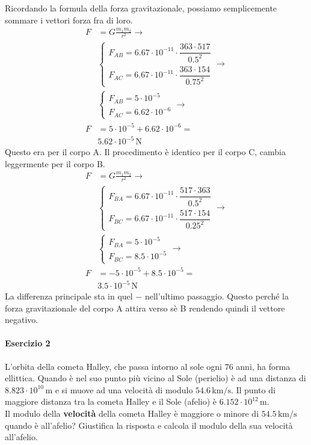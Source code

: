 Ricordando la formula della forza gravitazionale, possiamo semplicemente sommare i vettori forza fra
di loro.
\begin{align*}
  F &= G\frac{m_1m_2}{r^2} \rightarrow \\
    &\begin{cases*}
  F_{AB}  = 6.67\cdot10^{-11}\cdot\dfrac{363\cdot517}{0.5^2}\\
  F_{AC}  = 6.67\cdot10^{-11}\cdot\dfrac{363\cdot154}{0.75^2}
\end{cases*} \rightarrow\\
&\begin{cases*}
F_{AB}  = 5\cdot10^{-5}\\
F_{AC}  = 6.62\cdot10^{-6}
\end{cases*} \rightarrow\\
F &= 5\cdot10^{-5}+6.62\cdot10^{-6} = \\&
\boxed{5.62\cdot10^{-5}\,\text{N}}
\end{align*}
Questo era per il corpo A. Il procedimento è identico per il corpo C, cambia leggermente per il 
corpo B.
\begin{align*}
  F &= G\frac{m_1m_2}{r^2} \rightarrow\\
    &\begin{cases*}
  F_{BA} = 6.67\cdot10^{-11}\cdot\dfrac{517\cdot363}{0.5^2}\\
  F_{BC} = 6.67\cdot10^{-11}\cdot\dfrac{517\cdot154}{0.25^2}
\end{cases*} \rightarrow\\
&\begin{cases*}
F_{BA}  = 5\cdot10^{-5}\\
F_{BC}  = 8.5\cdot10^{-5}
\end{cases*} \rightarrow\\
F &= -5\cdot10^{-5}+8.5\cdot10^{-5} = \\
  &\boxed{3.5\cdot10^{-5}\,\text{N}}
\end{align*}
La differenza principale sta in quel $-$ nell'ultimo passaggio. Questo perché la forza 
gravitazionale del corpo A attira verso sè B rendendo quindi il vettore negativo.

\paragraph{Esercizio 2}
L'orbita della cometa Halley, che passa intorno al sole ogni $76$ anni, ha forma ellittica. Quando
è nel suo punto più vicino al Sole (perielio) è ad una distanza di $8.823\cdot10^{10}\,\text{m}$ e si
muove ad una velocità di modulo $54.6\,\text{km/s}$. Il punto di maggiore distanza tra la cometa 
Halley e il Sole (afelio) è $6.152\cdot10^{12}\,\text{m}$.\\
Il modulo della \textbf{velocità} della cometa Halley è maggiore o minore di $54.5\,\text{km/s}$ 
quando è all'afelio? Giustifica la risposta e calcola il modulo della sua velocità all'afelio.
\divisor

